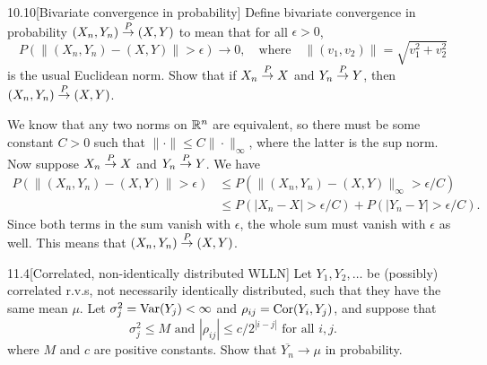 \documentclass{pset}
\begin{document}
\begin{parts}
\end{parts}

\begin{problem}{10.10}[Bivariate convergence in probability]
  Define bivariate convergence in probability $(X_n, Y_n) \toP (X,Y)$ to mean that for all $\epsilon>0$,
  \[
    P(\|(X_n, Y_n) - (X,Y)\| > \epsilon) \to 0,\quad\textrm{where}\quad \|(v_1, v_2)\| = \sqrt{v_1^2+v_2^2}
  \]
  is the usual Euclidean norm. Show that if $X_n \toP X$ and $Y_n \toP Y$, then $(X_n, Y_n)\toP (X,Y)$.
\end{problem}

\begin{solution}
  We know that any two norms on $\mathbb{R}^n$ are equivalent, so there must be some constant $C>0$ such that $\|\cdot\| \leq C \|\cdot\|_\infty$, where the latter is the sup norm. Now suppose $X_n \toP X$ and $Y_n\toP Y$. We have
  \[
    \begin{aligned}
      P(\|(X_n, Y_n) - (X,Y)\| > \epsilon) &\leq  P(\|(X_n, Y_n) - (X,Y)\|_\infty > \epsilon/C)\\
                                           &\leq P(|X_n - X| >\epsilon/C) + P(|Y_n - Y| > \epsilon/C).
    \end{aligned}
  \]
  Since both terms in the sum vanish with $\epsilon$, the whole sum must vanish with $\epsilon$ as well. This means that $(X_n, Y_n)\toP (X,Y)$.
\end{solution}

\begin{problem}{11.4}[Correlated, non-identically distributed WLLN]
  Let $Y_1, Y_2, \ldots$ be (possibly) correlated r.v.s, not necessarily identically distributed, such that they have the same mean $\mu$. Let $\sigma_j^2 = \textrm{Var}(Y_j)< \infty$ and $\rho_{ij} = \textrm{Cor}(Y_i, Y_j)$, and suppose that
  \[
    \sigma_j^2 \leq M \textrm{ and } |\rho_{ij}| \leq c/2^{|i-j|}\textrm{ for all }i,j.
  \]
  where $M$ and $c$ are positive constants. Show that $\overline{Y_n}\to \mu$ in probability.
\end{problem}
\end{document}
